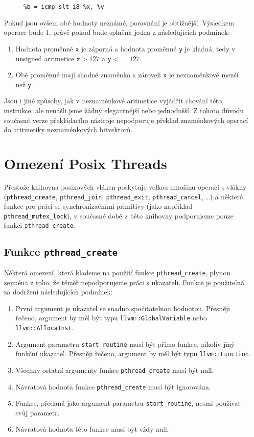 \documentclass[12pt]{fithesis2}
\begin{document}
\begin{figure}[h!]
\begin{lstlisting}
%b = icmp slt i8 %x, %y
\end{lstlisting}
\end{figure}

Pokud jsou ovšem obě hodnoty neznámé, porovnání je obtížnější. Výsledkem operace bude $1$, právě pokud bude splněna jedna z následujících podmínek:
\begin{enumerate}
\item Hodnota proměnné \texttt{x} je záporná a hodnota proměnné \texttt{y} je kladná, tedy v unsigned aritmetice $\texttt{x} > 127$ a $\texttt{y} <= 127$.
\item Obě proměnné mají shodné znaménko a zároveň \texttt{x} je neznaménkově menší než \texttt{y}.
\end{enumerate}

Jsou i jiné způsoby, jak v neznaménkové aritmetice vyjádřit chování této instrukce, ale nenašli jsme žádný elegantnější nebo jednodušší. Z tohoto důvodu současná verze překládacího nástroje nepodporuje překlad znaménkových operací do aritmetiky neznaménkových bitvektorů.

\section{Omezení Posix Threads}
Přestože knihovna posixových vláken poskytuje velkou množinu operací s vlákny (\texttt{pthread\_create}, \texttt{pthread\_join}, \texttt{pthread\_exit}, \linebreak\texttt{pthread\_cancel}, \ldots) a některé funkce pro práci se synchronizačními primitivy (jako například \texttt{pthread\_mutex\_lock}), v současné době z~této knihovny podporujeme pouze funkci \texttt{pthread\_create}.

\subsection{Funkce \texttt{pthread\_create}}
Některá omezení, která klademe na použití funkce \texttt{pthread\_create}, plynou zejména z toho, že téměř nepodporujeme práci s ukazateli. Funkce je použitelná za dodržení následujících podmínek:

\begin{enumerate}
\item První argument je ukazatel se snadno spočitatelnou hodnotou. Přesněji řečeno, argument by měl být typu \texttt{llvm::GlobalVariable} nebo \texttt{llvm::AllocaInst}.
\item Argument parametru \texttt{start\_routine} musí být přímo funkce, nikoliv jiný funkční ukazatel. Přesněji řečeno, argument by měl být typu \texttt{llvm::Function}.
\item Všechny ostatní argumenty funkce \texttt{pthread\_create} musí být null.
\item Návratová hodnota funkce \texttt{pthread\_create} musí být ignorována.
\item Funkce, předaná jako argument parametru \texttt{start\_routine}, nesmí používat svůj parametr.
\item Návratová hodnota této funkce musí být vždy null.
\end{enumerate}
\end{document}
